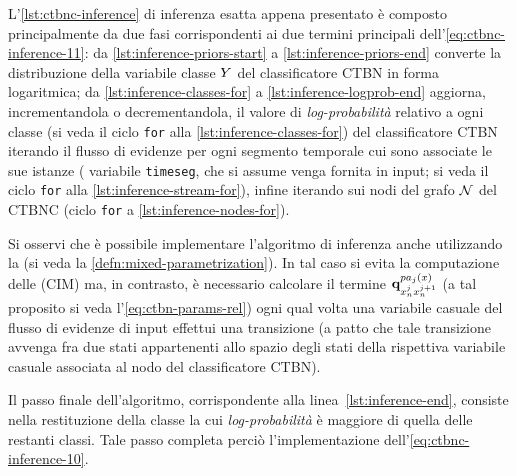 L'\autoref{lst:ctbnc-inference} di inferenza esatta appena presentato è composto principalmente da due fasi corrispondenti ai due termini principali dell'\autoref{eq:ctbnc-inference-11}: da \autoref{lst:inference-priors-start} a \autoref{lst:inference-priors-end} converte la distribuzione della variabile classe $\mathnormal{Y}$ del classificatore \acs{CTBN} in forma logaritmica; da \autoref{lst:inference-classes-for} a \autoref{lst:inference-logprob-end} aggiorna, incrementandola o decrementandola, il valore di \emph{log-probabilità} relativo a ogni classe (si veda il ciclo \lstinline[]|for| alla \autoref{lst:inference-classes-for}) del classificatore \acs{CTBN} iterando il flusso di evidenze per ogni segmento temporale cui sono associate le sue istanze (\ie{} variabile \lstinline[]|timeseg|, che si assume venga fornita in input; si veda il ciclo \lstinline[]|for| alla \autoref{lst:inference-stream-for}), infine iterando sui nodi del grafo $\mathcal{N}$ del \acs{CTBNC} (ciclo \lstinline[]|for| a \autoref{lst:inference-nodes-for}).
\begin{nota}
Si osservi che è possibile implementare l'algoritmo di inferenza anche utilizzando la \emph{} (si veda la \autoref{defn:mixed-parametrization}). In tal caso si evita la computazione delle \cim{} (\acs{CIM}) ma, in contrasto, è necessario calcolare il termine $\boldsymbol{\textbf{\text{q}}}_{\mathnormal{x}_n^j\mathnormal{x}_n^{j+1}}^{pa_j(\mathnormal{x})}$ (a tal proposito si veda l'\autoref{eq:ctbn-params-rel}) ogni qual volta una variabile casuale del flusso di evidenze di input effettui una transizione (a patto che tale transizione avvenga fra due stati appartenenti allo spazio degli stati della rispettiva variabile casuale associata al nodo del classificatore \acs{CTBN}).
\end{nota}

Il passo finale dell'algoritmo, corrispondente alla linea~\autoref{lst:inference-end}, consiste nella restituzione della classe la cui \emph{log-probabilità} è maggiore di quella delle restanti classi. Tale passo completa perciò l'implementazione dell'\autoref{eq:ctbnc-inference-10}.

